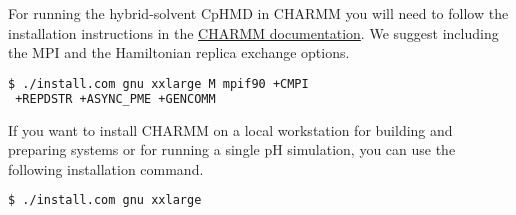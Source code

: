 For running the hybrid-solvent CpHMD \cite{Wallace_Shen_2011_J.Chem.TheoryComput.}
in CHARMM \cite{Brooks_Karplus_2009_J.Comput.Chem.}
you will need to follow the installation instructions in the \href{https://www.charmm.org/archive/charmm/documentation/installation/}{CHARMM documentation}.
We suggest including the MPI and the Hamiltonian replica exchange options.
\begin{lstlisting}[language=bash]
 $ ./install.com gnu xxlarge M mpif90 +CMPI
 +REPDSTR +ASYNC_PME +GENCOMM
 \end{lstlisting}
If you want to install CHARMM on a local workstation for building and preparing systems or for running a single pH simulation, you can use the following installation command.
\begin{lstlisting}[language=bash]
 $ ./install.com gnu xxlarge
 \end{lstlisting}




